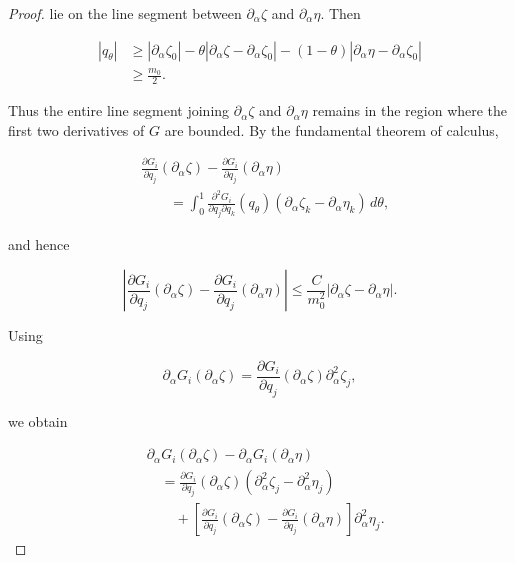 \documentclass[10pt,a4paper]{amsart}
\begin{document}
\begin{proof}
lie on the line segment between $\partial_\alpha \zeta$ and $\partial_\alpha \eta$. Then

$$
\begin{aligned}
    |q_\theta|
    &\geq
    |\partial_\alpha\zeta_0|
    -
    \theta
    |\partial_\alpha\zeta-\partial_\alpha\zeta_0|
    -
    (1-\theta)
    |\partial_\alpha\eta-\partial_\alpha\zeta_0|\\
    &\geq \frac{m_0}{2}.
\end{aligned}
$$

Thus the entire line segment joining
\(\partial_\alpha\zeta\) and \(\partial_\alpha\eta\) remains in the region where the first two derivatives of \(G\) are bounded. By the fundamental theorem of calculus,

$$
\begin{aligned}
    &\frac{\partial G_i}{\partial q_j}
        (\partial_\alpha\zeta)
    -
    \frac{\partial G_i}{\partial q_j}
        (\partial_\alpha\eta)\\
    &\qquad=
    \int_0^1
    \frac{\partial^2G_i}{\partial q_j\partial q_k}
        (q_\theta)
    \left(
        \partial_\alpha\zeta_k
        -
        \partial_\alpha\eta_k
    \right)\,d\theta,
\end{aligned}
$$

and hence

$$
    \left|
    \frac{\partial G_i}{\partial q_j}
        (\partial_\alpha\zeta)
    -
    \frac{\partial G_i}{\partial q_j}
        (\partial_\alpha\eta)
    \right|
    \leq
    \frac{C}{m_0^2}
    |\partial_\alpha\zeta-\partial_\alpha\eta|.
$$

Using

$$
    \partial_\alpha G_i(\partial_\alpha\zeta)
    =
    \frac{\partial G_i}{\partial q_j}
        (\partial_\alpha\zeta)
    \partial_\alpha^2\zeta_j,
$$

we obtain

$$
\begin{aligned}
    &\partial_\alpha G_i(\partial_\alpha\zeta)
    -
    \partial_\alpha G_i(\partial_\alpha\eta)\\
    &\quad=
    \frac{\partial G_i}{\partial q_j}
        (\partial_\alpha\zeta)
    \left(
        \partial_\alpha^2\zeta_j
        -
        \partial_\alpha^2\eta_j
    \right)\\
    &\qquad+
    \left[
        \frac{\partial G_i}{\partial q_j}
            (\partial_\alpha\zeta)
        -
        \frac{\partial G_i}{\partial q_j}
            (\partial_\alpha\eta)
    \right]
    \partial_\alpha^2\eta_j.
\end{aligned}
$$


\end{proof}
\end{document}
